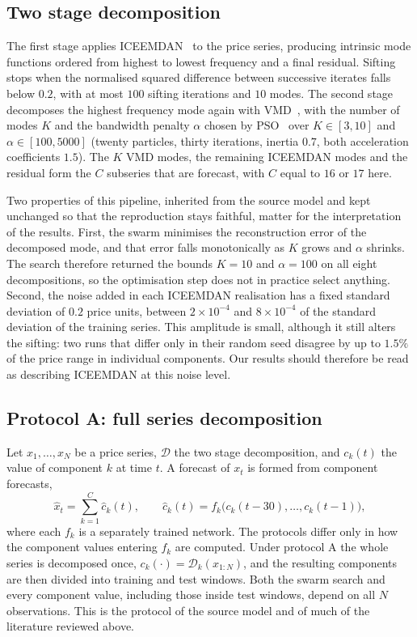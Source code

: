 \subsection{Two stage decomposition}
The first stage applies ICEEMDAN~\cite{colominas2014} to the price
series, producing intrinsic mode functions ordered from highest to lowest
frequency and a final residual. Sifting stops when the normalised squared
difference between successive iterates falls below $0.2$, with at most $100$
sifting iterations and $10$ modes. The second stage decomposes the highest
frequency mode again with VMD~\cite{dragomiretskiy2014}, with the number of modes $K$
and the bandwidth penalty $\alpha$ chosen by PSO~\cite{psosurvey2022} over
$K\in[3,10]$ and $\alpha\in[100,5000]$ (twenty particles, thirty iterations,
inertia $0.7$, both acceleration coefficients $1.5$). The $K$ VMD modes, the
remaining ICEEMDAN modes and the residual form the $C$ subseries that are
forecast, with $C$ equal to $16$ or $17$ here.

Two properties of this pipeline, inherited from the source model and kept
unchanged so that the reproduction stays faithful, matter for the
interpretation of the results. First, the swarm minimises the reconstruction
error of the decomposed mode, and that error falls monotonically as $K$ grows
and $\alpha$ shrinks. The search therefore returned the bounds $K=10$ and
$\alpha=100$ on all eight decompositions, so the optimisation step does not in
practice select anything. Second, the noise added in each ICEEMDAN realisation
has a fixed standard deviation of $0.2$ price units, between
$2\times10^{-4}$ and $8\times10^{-4}$ of the standard deviation of the
training series. This amplitude is small, although it still alters the
sifting: two runs that differ only in their random seed disagree by up to
$1.5\%$ of the price range in individual components. Our results should
therefore be read as describing ICEEMDAN at this noise level.

\subsection{Protocol A: full series decomposition}
Let $x_1,\dots,x_N$ be a price series, $\mathcal{D}$ the two stage
decomposition, and $c_k(t)$ the value of component $k$ at time $t$. A
forecast of $x_t$ is formed from component forecasts,
\begin{equation}
\hat{x}_t=\sum_{k=1}^{C}\hat{c}_k(t),\qquad
\hat{c}_k(t)=f_k\bigl(c_k(t-30),\dots,c_k(t-1)\bigr),
\label{eq:ensemble}
\end{equation}
where each $f_k$ is a separately trained network. The protocols differ only in
how the component values entering $f_k$ are computed. Under protocol A the
whole series is decomposed once, $c_k(\cdot)=\mathcal{D}_k(x_{1:N})$, and the
resulting components are then divided into training and test windows. Both the
swarm search and every component value, including those inside test windows,
depend on all $N$ observations. This is the protocol of the source model and of
much of the literature reviewed above.

